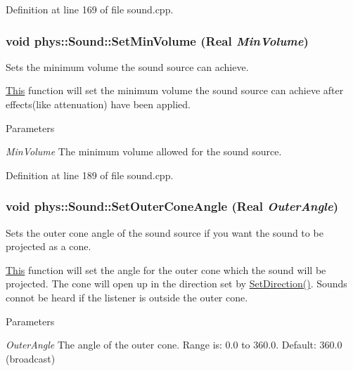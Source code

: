 Definition at line 169 of file sound.cpp.

\hypertarget{classphys_1_1Sound_a76a487c8a455556ba4307c99cc41ea80}{
\subsubsection[{SetMinVolume}]{\setlength{\rightskip}{0pt plus 5cm}void phys::Sound::SetMinVolume ({\bf Real} {\em MinVolume})}}
\label{dc/d2f/classphys_1_1Sound_a76a487c8a455556ba4307c99cc41ea80}


Sets the minimum volume the sound source can achieve. 

\hyperlink{structThis}{This} function will set the minimum volume the sound source can achieve after effects(like attenuation) have been applied. 
\begin{DoxyParams}{Parameters}
\item[{\em MinVolume}]The minimum volume allowed for the sound source. \end{DoxyParams}


Definition at line 189 of file sound.cpp.

\hypertarget{classphys_1_1Sound_a4fc7d07d303ddb97acc15524950d0442}{
\subsubsection[{SetOuterConeAngle}]{\setlength{\rightskip}{0pt plus 5cm}void phys::Sound::SetOuterConeAngle ({\bf Real} {\em OuterAngle})}}
\label{dc/d2f/classphys_1_1Sound_a4fc7d07d303ddb97acc15524950d0442}


Sets the outer cone angle of the sound source if you want the sound to be projected as a cone. 

\hyperlink{structThis}{This} function will set the angle for the outer cone which the sound will be projected. The cone will open up in the direction set by \hyperlink{classphys_1_1Sound_af2d6aa7e1b3b2e9f60b8dbbe8aa2d381}{SetDirection()}. Sounds connot be heard if the listener is outside the outer cone. 
\begin{DoxyParams}{Parameters}
\item[{\em OuterAngle}]The angle of the outer cone. Range is: 0.0 to 360.0. Default: 360.0 (broadcast) \end{DoxyParams}


